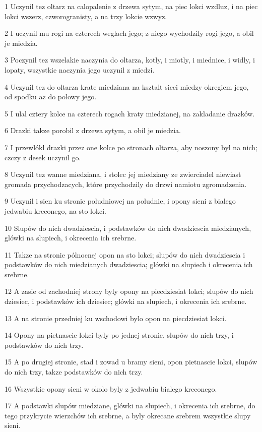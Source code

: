 \par 1 Uczynil tez oltarz na calopalenie z drzewa sytym, na piec lokci wzdluz, i na piec lokci wszerz, czworogranisty, a na trzy lokcie wzwyz.
\par 2 I uczynil mu rogi na czterech weglach jego; z niego wychodzily rogi jego, a obil je miedzia.
\par 3 Poczynil tez wszelakie naczynia do oltarza, kotly, i miotly, i miednice, i widly, i lopaty, wszystkie naczynia jego uczynil z miedzi.
\par 4 Uczynil tez do oltarza krate miedziana na ksztalt sieci miedzy okregiem jego, od spodku az do polowy jego.
\par 5 I ulal cztery kolce na czterech rogach kraty miedzianej, na zakladanie drazków.
\par 6 Drazki takze porobil z drzewa sytym, a obil je miedzia.
\par 7 I przewlókl drazki przez one kolce po stronach oltarza, aby noszony byl na nich; czczy z desek uczynil go.
\par 8 Uczynil tez wanne miedziana, i stolec jej miedziany ze zwierciadel niewiast gromada przychodzacych, które przychodzily do drzwi namiotu zgromadzenia.
\par 9 Uczynil i sien ku stronie poludniowej na poludnie, i opony sieni z bialego jedwabiu kreconego, na sto lokci.
\par 10 Slupów do nich dwadziescia, i podstawków do nich dwadziescia miedzianych, glówki na slupiech, i okrecenia ich srebrne.
\par 11 Takze na stronie pólnocnej opon na sto lokci; slupów do nich dwadziescia i podstawków do nich miedzianych dwadziescia; glówki na slupiech i okrecenia ich srebrne.
\par 12 A zasie od zachodniej strony byly opony na piecdziesiat lokci; slupów do nich dziesiec, i podstawków ich dziesiec; glówki na slupiech, i okrecenia ich srebrne.
\par 13 A na stronie przedniej ku wschodowi bylo opon na piecdziesiat lokci.
\par 14 Opony na pietnascie lokci byly po jednej stronie, slupów do nich trzy, i podstawków do nich trzy.
\par 15 A po drugiej stronie, stad i zowad u bramy sieni, opon pietnascie lokci, slupów do nich trzy, takze podstawków do nich trzy.
\par 16 Wszystkie opony sieni w okolo byly z jedwabiu bialego kreconego.
\par 17 A podstawki slupów miedziane, glówki na slupiech, i okrecenia ich srebrne, do tego przykrycie wierzchów ich srebrne, a byly okrecane srebrem wszystkie slupy sieni.
